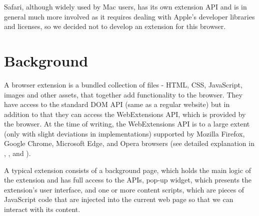 \documentclass[bsc,frontabs,twoside,singlespacing,parskip,deptreport]{infthesis}
\begin{document}
Safari, although widely used by Mac users, has its own extension API and is in general much more involved as it requires dealing with Apple's developer libraries and licenses, so we decided not to develop an extension for this browser.






\chapter{Background}
A browser extension is a bundled collection of files - HTML, CSS, JavaScript, images and other assets, that together add functionality to the browser. They have access to the standard DOM API (same as a regular website) but in addition to that they can access the WebExtensions API, which is provided by the browser. At the time of writing, the WebExtensions API is to a large extent (only with slight deviations in implementations) supported by Mozilla Firefox, Google Chrome, Microsoft Edge, and Opera browsers (see detailed explanation in \cite{C1}, \cite{C2}, \cite{M6} and \cite{M7}).

A typical extension consists of a background page, which holds the main logic of the extension and has full access to the APIs, pop-up widget, which presents the extension's user interface, and one or more content scripts, which are pieces of JavaScript code that are injected into the current web page so that we can interact with its content.
\end{document}
